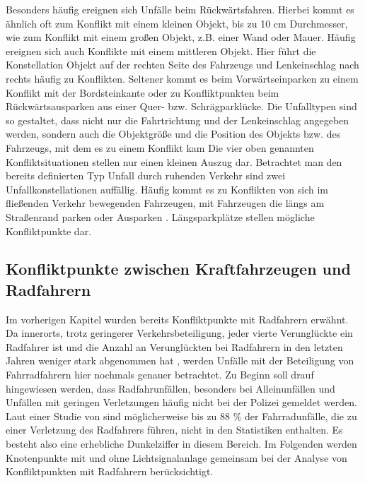 Besonders häufig ereignen sich Unfälle beim Rückwärtsfahren. Hierbei kommt es ähnlich oft zum Konflikt mit einem kleinen Objekt, bis zu 10 cm Durchmesser, wie zum Konflikt mit einem großen Objekt, z.B. einer Wand oder Mauer. Häufig ereignen sich auch Konflikte mit einem mittleren Objekt. Hier führt die Konstellation Objekt auf der rechten Seite des Fahrzeugs und Lenkeinschlag nach rechts häufig zu Konflikten. Seltener kommt es beim Vorwärtseinparken zu einem Konflikt mit der Bordsteinkante oder zu Konfliktpunkten beim Rückwärtsausparken aus einer Quer- bzw. Schrägparklücke. Die Unfalltypen sind so gestaltet, dass nicht nur die Fahrtrichtung und der Lenkeinschlag angegeben werden, sondern auch die Objektgröße und die Position des Objekts bzw. des Fahrzeugs, mit dem es zu einem Konflikt kam \parencite[S. 58-61]{Gschwendtner.2015} Die vier oben genannten Konfliktsituationen stellen nur einen kleinen Auszug dar. Betrachtet man den bereits definierten Typ Unfall durch ruhenden Verkehr sind zwei Unfallkonstellationen auffällig. Häufig kommt es zu Konflikten von sich im fließenden Verkehr bewegenden Fahrzeugen, mit  Fahrzeugen die längs am Straßenrand parken oder Ausparken \parencite[S. 53]{Vollrath.2006}. Längsparkplätze stellen mögliche Konfliktpunkte dar. %

\subsection{Konfliktpunkte zwischen Kraftfahrzeugen und Radfahrern}\label{subsection:Konfliktpunkte zwischen Kraftfahrzeugen und Radfahrern}
Im vorherigen Kapitel wurden bereits Konfliktpunkte mit Radfahrern erwähnt. Da innerorts, trotz geringerer Verkehrsbeteiligung, jeder vierte Verunglückte ein Radfahrer ist \parencite[S. 303]{Schreiber.2014b} und die Anzahl an Verunglückten bei Radfahrern in den letzten Jahren weniger stark abgenommen hat \parencite[S. 7]{Below.2016}, werden Unfälle mit der Beteiligung von Fahrradfahrern hier nochmals genauer betrachtet. Zu Beginn soll drauf hingewiesen werden, dass Radfahrunfällen, besonders bei Alleinunfällen und Unfällen mit geringen Verletzungen häufig nicht bei der Polizei gemeldet werden. Laut einer Studie von \Textcite[S. 80]{Below.2016} sind möglicherweise bis zu 88 \% der Fahrradunfälle, die zu einer Verletzung des Radfahrers führen, nicht in den Statistiken enthalten. Es besteht also eine erhebliche Dunkelziffer in diesem Bereich. Im Folgenden werden Knotenpunkte mit und ohne Lichtsignalanlage gemeinsam bei der Analyse von Konfliktpunkten mit Radfahrern berücksichtigt.

